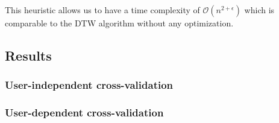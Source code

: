 This heuristic allows us to have a time complexity of $\mathcal{O}(n^{2 + \epsilon})$ which is comparable to the DTW algorithm without any optimization.

\subsection{Results}

\subsubsection{User-independent cross-validation}



\subsubsection{User-dependent cross-validation}